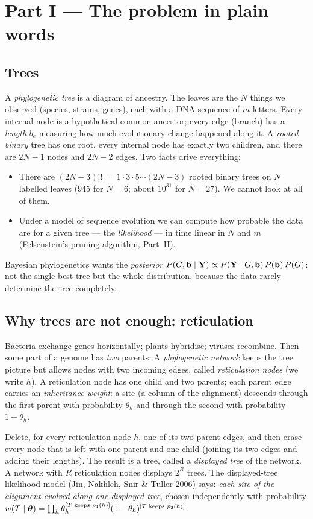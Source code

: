 \section{Part I --- The problem in plain words}

\subsection{Trees}
A \emph{phylogenetic tree} is a diagram of ancestry. The leaves are the $N$ things we observed (species, strains, genes), each with a DNA sequence of $m$ letters. Every internal node is a hypothetical common ancestor; every edge (branch) has a \emph{length} $b_e$ measuring how much evolutionary change happened along it. A \emph{rooted binary} tree has one root, every internal node has exactly two children, and there are $2N-1$ nodes and $2N-2$ edges. Two facts drive everything:
\begin{itemize}[nosep]
  \item There are $(2N-3)!!\,=\,1\cdot3\cdot5\cdots(2N-3)$ rooted binary trees on $N$ labelled leaves (945 for $N=6$; about $10^{31}$ for $N=27$). We cannot look at all of them.
  \item Under a model of sequence evolution we can compute how probable the data are for a given tree --- the \emph{likelihood} --- in time linear in $N$ and $m$ (Felsenstein's pruning algorithm, Part~II).
\end{itemize}
Bayesian phylogenetics wants the \emph{posterior} $P(G,\mathbf{b}\mid\mathbf{Y})\propto P(\mathbf{Y}\mid G,\mathbf{b})\,P(\mathbf{b})\,P(G)$: not the single best tree but the whole distribution, because the data rarely determine the tree completely.

\subsection{Why trees are not enough: reticulation}
Bacteria exchange genes horizontally; plants hybridise; viruses recombine. Then some part of a genome has \emph{two} parents. A \emph{phylogenetic network} keeps the tree picture but allows nodes with two incoming edges, called \emph{reticulation nodes} (we write $h$). A reticulation node has one child and two parents; each parent edge carries an \emph{inheritance weight}: a site (a column of the alignment) descends through the first parent with probability $\theta_h$ and through the second with probability $1-\theta_h$.

\begin{defbox}
Delete, for every reticulation node $h$, one of its two parent edges, and then erase every node that is left with one parent and one child (joining its two edges and adding their lengths). The result is a tree, called a \emph{displayed tree} of the network. A network with $R$ reticulation nodes displays $2^R$ trees. The displayed-tree likelihood model (Jin, Nakhleh, Snir \& Tuller 2006) says: \emph{each site of the alignment evolved along one displayed tree}, chosen independently with probability $w(T\mid\bm{\theta})=\prod_h \theta_h^{[T\text{ keeps }p_1(h)]}(1-\theta_h)^{[T\text{ keeps }p_2(h)]}$.
\end{defbox}

